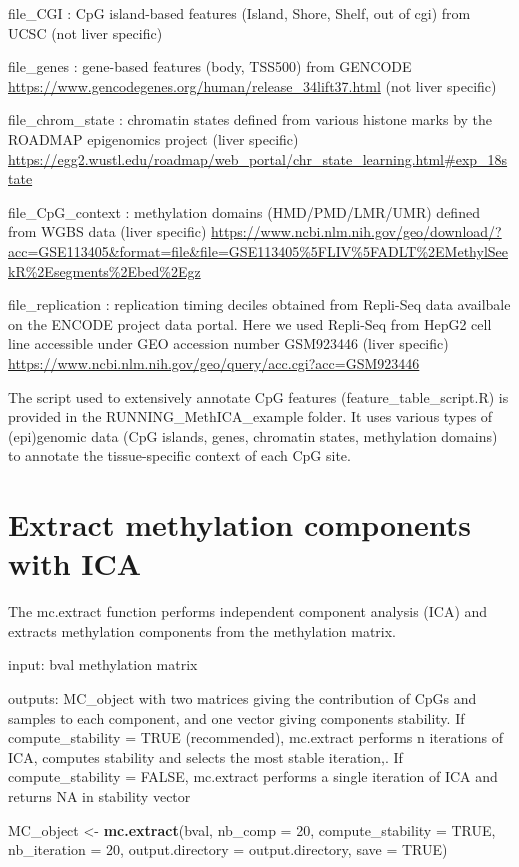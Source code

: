 \documentclass[]{article}
\newenvironment{Shaded}{\begin{snugshade}}{\end{snugshade}}
\newcommand{\KeywordTok}[1]{\textcolor[rgb]{0.13,0.29,0.53}{\textbf{#1}}}
\newcommand{\DataTypeTok}[1]{\textcolor[rgb]{0.13,0.29,0.53}{#1}}
\newcommand{\DecValTok}[1]{\textcolor[rgb]{0.00,0.00,0.81}{#1}}
\newcommand{\StringTok}[1]{\textcolor[rgb]{0.31,0.60,0.02}{#1}}
\newcommand{\OtherTok}[1]{\textcolor[rgb]{0.56,0.35,0.01}{#1}}
\newcommand{\NormalTok}[1]{#1}
\begin{document}
file\_CGI : CpG island-based features (Island, Shore, Shelf, out of cgi)
from UCSC (not liver specific)

file\_genes : gene-based features (body, TSS500) from GENCODE
\url{https://www.gencodegenes.org/human/release_34lift37.html} (not
liver specific)

file\_chrom\_state : chromatin states defined from various histone marks
by the ROADMAP epigenomics project (liver specific)
\url{https://egg2.wustl.edu/roadmap/web_portal/chr_state_learning.html\#exp_18state}

file\_CpG\_context : methylation domains (HMD/PMD/LMR/UMR) defined from
WGBS data (liver specific)
\url{https://www.ncbi.nlm.nih.gov/geo/download/?acc=GSE113405\&format=file\&file=GSE113405\%5FLIV\%5FADLT\%2EMethylSeekR\%2Esegments\%2Ebed\%2Egz}

file\_replication : replication timing deciles obtained from Repli-Seq
data availbale on the ENCODE project data portal. Here we used Repli-Seq
from HepG2 cell line accessible under GEO accession number GSM923446
(liver specific)
\url{https://www.ncbi.nlm.nih.gov/geo/query/acc.cgi?acc=GSM923446}

The script used to extensively annotate CpG features
(feature\_table\_script.R) is provided in the RUNNING\_MethICA\_example
folder. It uses various types of (epi)genomic data (CpG islands, genes,
chromatin states, methylation domains) to annotate the tissue-specific
context of each CpG site.

\section{Extract methylation components with
ICA}\label{extract-methylation-components-with-ica}

The mc.extract function performs independent component analysis (ICA)
and extracts methylation components from the methylation matrix.

input: bval methylation matrix

outputs: MC\_object with two matrices giving the contribution of CpGs
and samples to each component, and one vector giving components
stability. If compute\_stability = TRUE (recommended), mc.extract
performs n iterations of ICA, computes stability and selects the most
stable iteration,. If compute\_stability = FALSE, mc.extract performs a
single iteration of ICA and returns NA in stability vector

\begin{Shaded}
\begin{Highlighting}[]
\NormalTok{MC_object <-}\StringTok{ }\KeywordTok{mc.extract}\NormalTok{(bval, }\DataTypeTok{nb_comp =} \DecValTok{20}\NormalTok{, }\DataTypeTok{compute_stability =} \OtherTok{TRUE}\NormalTok{, }\DataTypeTok{nb_iteration =} \DecValTok{20}\NormalTok{, }\DataTypeTok{output.directory =}\NormalTok{ output.directory, }\DataTypeTok{save =} \OtherTok{TRUE}\NormalTok{)}
\end{Highlighting}
\end{Shaded}
\end{document}
